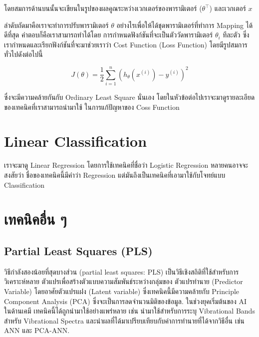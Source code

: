 \noindent โดยสมการด้านบนนั้นจะเขียนในรูปของผลคูณระหว่างเวกเตอร์ของพารามิเตอร์ ($\theta^{\top}$) และเวกเตอร์ $x$

ลำดับถัดมาคือเราจะทำการปรับพารามิเตอร์ $\theta$ อย่างไรเพื่อให้ได้ชุดพารามิเตอร์ที่ทำการ Mapping ได้ดีที่สุด คำตอบก็คือเราสามารถทำได้โดย%
การกำหนดฟังก์ชันที่จะเป็นตัววัดพารามิเตอร์ $\theta_{i}$ ทีละตัว ซึ่งเรากำหนดและเรียกฟังก์ชันที่จะมาช่วยเราว่า Cost Function (Loss Function)
โดยมีรูปสมการทั่วไปดังต่อไปนี้ 

\begin{equation}
    J(\theta) = \frac 1 2 \sum_{i=1}^n \left( h_\theta(x^{(i)}) - y^{(i)} \right)^2
\end{equation}

\noindent ซึ่งจะมีความคล้ายกันกับ Ordinary Least Square นั่นเอง โดยในหัวข้อต่อไปเราจะมาดูรายละเอียดของเทคนิคที่เราสามารถนำมาใช้%
ในการแก้ปัญหาของ Coss Function

\section{Linear Classification}
\label{sec:lin_class}

เราจะมาดู Linear Regression โดยการใช้เทคนิคที่ชื่อว่า Logistic Regression หลายคนอาจจะสงสัยว่า ชื่อของเทคนิคนี้มีคำว่า Regression 
แต่มันถึงเป็นเทคนิคที่เอามาใช้กับโจทย์แบบ Classification

\section{เทคนิคอื่น ๆ}

\subsection{Partial Least Squares (PLS)}
\label{sec:pls}

วิธีกำลังสองน้อยที่สุดบางส่วน (partial least squares: PLS) 
เป็นวิธีเชิงสถิติที่ใช้สำหรับการวิเคราะห์หลาย ตัวแปรเพื่อสร้างตัวแบบความสัมพันธ์ระหว่างกลุ่มของ ตัวแปรทำนาย (Predictor Variable) 
โดยอาศัยตัวแปรแฝง (Latent variable) ซึ่งเทคนิคนี้มีความคล้ายกับ Principle Component Analysis (PCA) 
ซึ่งจะเป็นการลดจำนวนมิติของข้อมูล.\cite{wold1984} ในช่วงยุคเริ่มต้นของ AI ในด้านเคมี เทคนิคนี้ได้ถูกนำมาใช้อย่างแพร่หลาย เช่น 
นำมาใช้สำหรับการระบุ Vibrational Bands สำหรับ Vibrational Spectra และนำผลที่ได้มาเปรียบเทียบกับค่าการทำนายที่ได้จากวิธีอื่น เช่น
ANN และ PCA-ANN.

